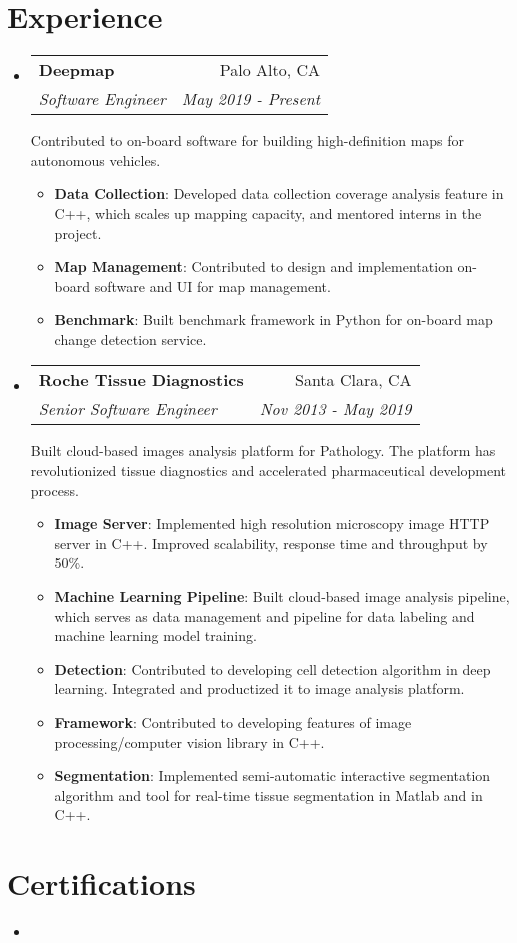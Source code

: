 \documentclass[letterpaper,12pt]{article}
\makeatletter
\newcommand{\resumeSubheading}[4]{
  \vspace{-1pt}\item
    \begin{tabular*}{0.97\textwidth}{l@{\extracolsep{\fill}}r}
      \textbf{#1} & #2 \\
      \textit{\small#3} & \textit{\small #4} \\
    \end{tabular*}
    \vspace{-7pt}
}
\newcommand{\resumeItem}[2]{
  \item\small{
    \textbf{#1}{: #2 \vspace{-2pt}}
  }
}
\newcommand{\resumeSummary}[1]{
  \vspace{11pt}
  	\small {#1 \vspace{-6pt}}
}
\newcommand{\resumeSubHeadingListStart}{\begin{itemize}[leftmargin=*]}
\newcommand{\resumeSubHeadingListEnd}{\end{itemize}}
\newcommand{\resumeItemListStart}{\begin{itemize}}
\newcommand{\resumeItemListEnd}{\end{itemize}\vspace{-5pt}}
\makeatother
\begin{document}
\section{Experience}
  \resumeSubHeadingListStart
    \resumeSubheading
      {Deepmap}{Palo Alto, CA}
      {Software Engineer}{May 2019 - Present}
      \resumeSummary 
      {Contributed to on-board software for building high-definition maps for autonomous vehicles.}
      \resumeItemListStart
        \resumeItem {Data Collection}
        {Developed data collection coverage analysis feature in C++, which scales up mapping capacity, and mentored interns in the project.}
        \resumeItem {Map Management}
        {Contributed to design and implementation on-board software and UI for map management.}
        \resumeItem {Benchmark}
        {Built benchmark framework in Python for on-board map change detection service.}
      \resumeItemListEnd
    \resumeSubheading
      {Roche Tissue Diagnostics}{Santa Clara, CA}
      {Senior Software Engineer}{Nov 2013 - May 2019}
      \resumeSummary 
      {Built cloud-based images analysis platform for Pathology. The platform has revolutionized tissue diagnostics and accelerated pharmaceutical development process.}
      \resumeItemListStart
        \resumeItem {Image Server}
          {Implemented high resolution microscopy image HTTP server in C++. Improved scalability, response time and throughput by 50\%.}
        \resumeItem {Machine Learning Pipeline}
          {Built cloud-based image analysis pipeline, which serves as data management and pipeline for data labeling and machine learning model training.}
        \resumeItem {Detection}
          {Contributed to developing cell detection algorithm in deep learning. Integrated and productized it to image analysis platform.}
        \resumeItem {Framework}
          {Contributed to developing features of image processing/computer vision library in C++.}
        \resumeItem {Segmentation}
          {Implemented semi-automatic interactive segmentation algorithm and tool for real-time tissue segmentation in Matlab and in C++.}
      \resumeItemListEnd
  \resumeSubHeadingListEnd

\section{Certifications}
  \resumeSubHeadingListStart
    \item[]{
    }
  \resumeSubHeadingListEnd
\end{document}
